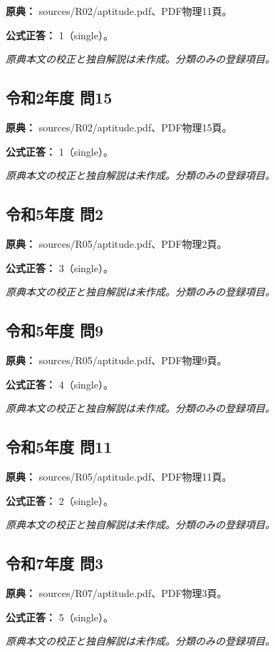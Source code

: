 \noindent\textbf{原典：} sources/R02/aptitude.pdf、PDF物理11頁。

\textbf{公式正答：} 1（single）。

\par\textit{原典本文の校正と独自解説は未作成。分類のみの登録項目。}

\subsection{令和2年度 問15}
\label{q:r02-reg-apt-15}

\noindent\textbf{原典：} sources/R02/aptitude.pdf、PDF物理15頁。

\textbf{公式正答：} 1（single）。

\par\textit{原典本文の校正と独自解説は未作成。分類のみの登録項目。}

\subsection{令和5年度 問2}
\label{q:r05-reg-apt-02}

\noindent\textbf{原典：} sources/R05/aptitude.pdf、PDF物理2頁。

\textbf{公式正答：} 3（single）。

\par\textit{原典本文の校正と独自解説は未作成。分類のみの登録項目。}

\subsection{令和5年度 問9}
\label{q:r05-reg-apt-09}

\noindent\textbf{原典：} sources/R05/aptitude.pdf、PDF物理9頁。

\textbf{公式正答：} 4（single）。

\par\textit{原典本文の校正と独自解説は未作成。分類のみの登録項目。}

\subsection{令和5年度 問11}
\label{q:r05-reg-apt-11}

\noindent\textbf{原典：} sources/R05/aptitude.pdf、PDF物理11頁。

\textbf{公式正答：} 2（single）。

\par\textit{原典本文の校正と独自解説は未作成。分類のみの登録項目。}

\subsection{令和7年度 問3}
\label{q:r07-reg-apt-03}

\noindent\textbf{原典：} sources/R07/aptitude.pdf、PDF物理3頁。

\textbf{公式正答：} 5（single）。

\par\textit{原典本文の校正と独自解説は未作成。分類のみの登録項目。}
